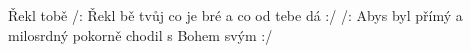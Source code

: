 \begin{TEXT}{Řekl tobě}
\SLOKA /: Řekl bě tvůj  \NL
co je bré a co  od tebe dá :/ 
\SLOKA /: Abys byl přímý a milosrdný \NL
pokorně chodil s Bohem svým :/ \NL
\end{TEXT}
